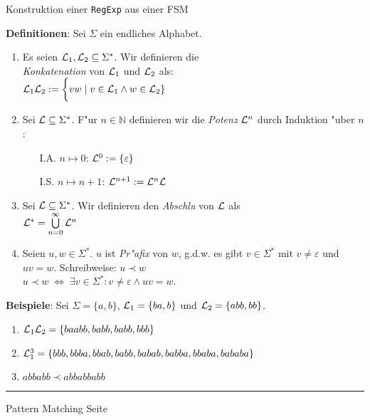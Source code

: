 \begin{slide}{}
\normalsize

\begin{center}
Konstruktion einer \texttt{RegExp} aus einer FSM
\end{center}
\vspace*{0.5cm}

\footnotesize
\textbf{Definitionen}: Sei $\Sigma$ ein endliches Alphabet.
\begin{enumerate}
\item  Es seien ${\cal L}_1, {\cal L}_2 \subseteq \Sigma^*$. Wir definieren die\\ 
       \emph{Konkatenation} von ${\cal L}_1$ und ${\cal L}_2$ als:\\[0.3cm]
      \hspace*{1.3cm} ${\cal L}_1 {\cal L}_2 := \bigg\{ vw  \;|\; v \in {\cal L}_1 \wedge w \in {\cal L}_2 \}$
\item Sei ${\cal L} \subseteq \Sigma^*$. F"ur $n \in \mathbb{N}$ definieren wir die \emph{Potenz} ${\cal L}^n$ durch
      Induktion "uber $n$:
      \begin{enumerate}
      \item[I.A.] $n \mapsto 0$:    \hspace*{2.3cm} ${\cal L}^0 := \{ \varepsilon \}$
      \item[I.S.] $n \mapsto n+1$: \hspace*{1.0cm} ${\cal L}^{n+1} := {\cal L}^n {\cal L}$
      \end{enumerate}
\item Sei ${\cal L} \subseteq \Sigma^*$. Wir definieren den \emph{Abschlu\3} von ${\cal L}$ als \\[0.3cm]
      \hspace*{1.3cm} ${\cal L}^* = \bigcup\limits_{n=0}^\infty {\cal L}^n$
\item Seien $u,w \in \Sigma^*$.  $u$ ist \emph{Pr"afix} von $w$,
      g.d.w. es gibt $v \in \Sigma^*$  mit $v \not= \varepsilon$ und $uv = w$.
      Schreibweise: $u \prec w$        \\[0.3cm]
      \hspace*{1.3cm} $u \prec w \;\Leftrightarrow\; \exists v \in \Sigma^*: v \not= \varepsilon \wedge uv = w$.
\end{enumerate}
\textbf{Beispiele}: Sei $\Sigma = \{a,b\}$, ${\cal L}_1 = \{ba, b\}$ und ${\cal L}_2 = \{abb, bb\}$.
\begin{enumerate}
\item ${\cal L}_1{\cal L}_2 = \{ baabb, babb, babb, bbb\}$
\item ${\cal L}_1^3 = \{ bbb, bbba, bbab, babb, babab, babba, bbaba, bababa \}$
\item $abbabb \prec abbabbabb$
\end{enumerate}

\vspace*{\fill}
\tiny \addtocounter{mypage}{1}
\rule{17cm}{1mm}
Pattern Matching \hspace*{\fill} Seite 
\end{slide}

